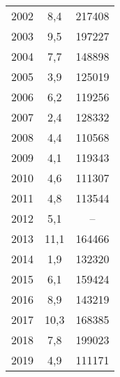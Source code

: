 \documentclass[french,11pt]{book}
\begin{document}
\begin{longtable}[t]{ccc}
2002 & 8,4 & 217408\\
2003 & 9,5 & 197227\\
2004 & 7,7 & 148898\\
2005 & 3,9 & 125019\\
2006 & 6,2 & 119256\\
2007 & 2,4 & 128332\\
2008 & 4,4 & 110568\\
2009 & 4,1 & 119343\\
2010 & 4,6 & 111307\\
2011 & 4,8 & 113544\\
2012 & 5,1 & --\\
2013 & 11,1 & 164466\\
2014 & 1,9 & 132320\\
2015 & 6,1 & 159424\\
2016 & 8,9 & 143219\\
2017 & 10,3 & 168385\\
2018 & 7,8 & 199023\\
2019 & 4,9 & 111171\\*
\end{longtable}
\clearpage
\end{document}
